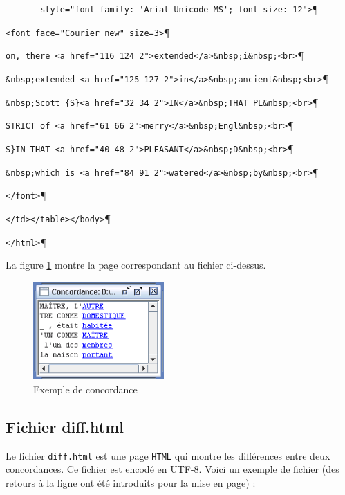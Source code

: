\verb$       style="font-family: 'Arial Unicode MS'; font-size: 12">$\P

\verb$<font face="Courier new" size=3>$\P

\verb$on, there <a href="116 124 2">extended</a>&nbsp;i&nbsp;<br>$\P

\verb$&nbsp;extended <a href="125 127 2">in</a>&nbsp;ancient&nbsp;<br>$\P

\verb$&nbsp;Scott {S}<a href="32 34 2">IN</a>&nbsp;THAT PL&nbsp;<br>$\P

\verb$STRICT of <a href="61 66 2">merry</a>&nbsp;Engl&nbsp;<br>$\P

\verb+S}IN THAT <a href="40 48 2">PLEASANT</a>&nbsp;D&nbsp;<br>+\P

\verb+&nbsp;which is <a href="84 91 2">watered</a>&nbsp;by&nbsp;<br>+\P

\verb$</font>$\P

\verb$</td></table></body>$\P

\verb$</html>$\P


\bigskip
\noindent La figure \ref{fig-example-concordance-2} montre la page correspondant au fichier
ci-dessus.

\begin{figure}[!h]
\begin{center}
\includegraphics[width=5cm]{resources/img/fig10-2.png}
\caption{Exemple de concordance \label{fig-example-concordance-2}}
\end{center}
\end{figure}



\subsection{Fichier diff.html}
Le fichier \verb+diff.html+ est une page \verb+HTML+ qui montre les différences entre deux concordances. Ce fichier est encodé en UTF-8. Voici un exemple de fichier (des retours à la ligne ont été introduits pour la mise en page) :



